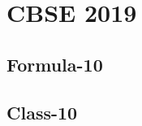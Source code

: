 \documentclass[journal]{IEEEtran}
\begin{document}
\newpage


\tableofcontents

\newpage
\onecolumn


\renewcommand{\thetable}{\theenumi}

\section{CBSE 2019}
\subsection{Formula-10}

\subsection{Class-10}

\end{document}
